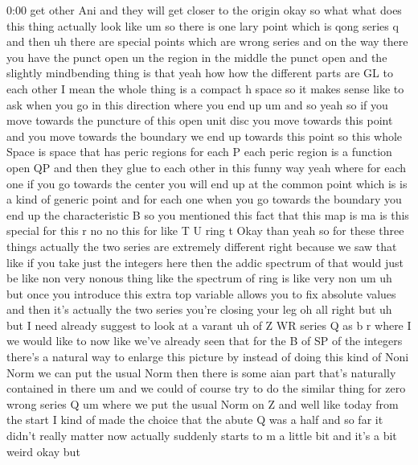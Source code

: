 \begin{unfinished}{0:00}
get  other
Ani  and  they  will  get  closer  to  the
origin  okay  so  what  what  does  this  thing
actually  look
like  um
so  there  is  one  lary  point  which  is  qong
series
q  and  then  uh  there  are  special  points
which  are  wrong
series  and  on  the  way  there  you  have  the
punct  open
un  the  region  in  the  middle  the  punct
open  and  the  slightly  mindbending  thing
is
that  yeah  how  how  the  different  parts
are  GL  to  each  other  I  mean  the  whole
thing  is  a  compact  h  space  so  it  makes
sense  like  to  ask  when  you  go  in  this
direction  where  you  end  up  um
and  so  yeah  so  if  you  move  towards  the
puncture  of  this  open  unit  disc  you  move
towards  this  point  and  you  move  towards
the  boundary  we  end  up  towards  this
point  so  this  whole  Space  is  space  that
has  peric  regions  for  each  P  each  peric
region  is  a  function  open  QP  and  then
they  glue  to  each  other  in  this  funny
way  yeah  where  for  each  one  if  you  go
towards  the  center  you  will  end  up  at
the  common  point  which  is  is  a  kind  of
generic  point  and  for  each  one  when  you
go  towards  the  boundary  you  end  up  the
characteristic
B  so  you  mentioned  this  fact  that  this
map  is
ma  is  this  special  for  this  r  no  no  this
for  like  T  U  ring  t  Okay
than  yeah  so  for  these  three  things
actually  the  two  series  are  extremely
different  right  because  we  saw  that  like
if  you  take  just  the  integers  here  then
the  addic  spectrum  of  that  would  just  be
like  non  very  nonous  thing  like  the
spectrum  of  ring  is  like  very  non
um  uh  but  once  you  introduce  this  extra
top  variable  allows  you  to  fix  absolute
values  and  then  it's  actually  the  two
series  you're  closing  your
leg
oh
all  right  but
uh  but  I  need  already
suggest
to  look  at  a
varant  uh  of  Z  WR  series
Q  as  b
r  where  I  we  would  like  to  now  like
we've  already  seen  that  for  the  B  of  SP
of  the  integers  there's  a  natural  way  to
enlarge  this  picture
by  instead  of  doing  this  kind  of  Noni
Norm  we  can  put  the  usual  Norm  then
there  is  some  aian  part  that's  naturally
contained  in  there  um  and  we  could  of
course  try  to  do  the  similar  thing  for
zero  wrong  series  Q
um  where  we  put  the  usual
Norm  on  Z  and
well  like  today  from  the  start  I  kind  of
made  the  choice  that  the  abute  Q  was  a
half  and  so  far  it  didn't  really  matter
now  actually  suddenly  starts  to  m  a
little  bit  and  it's  a  bit  weird  okay  but

\end{unfinished}
